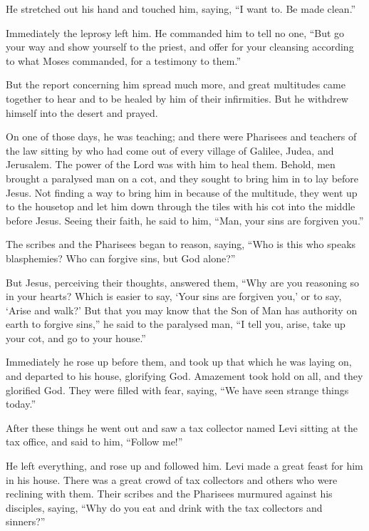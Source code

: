  He stretched out his hand and touched him, saying, ``I
want to. Be made clean.''

Immediately the leprosy left him.  He commanded him to
tell no one, ``But go your way and show yourself to the priest, and
offer for your cleansing according to what Moses commanded, for a
testimony to them.''

 But the report concerning him spread much more, and
great multitudes came together to hear and to be healed by him of their
infirmities.  But he withdrew himself into the desert and
prayed.

 On one of those days, he was teaching; and there were
Pharisees and teachers of the law sitting by who had come out of every
village of Galilee, Judea, and Jerusalem. The power of the Lord was with
him to heal them.  Behold, men brought a paralysed man on
a cot, and they sought to bring him in to lay before Jesus.
 Not finding a way to bring him in because of the
multitude, they went up to the housetop and let him down through the
tiles with his cot into the middle before Jesus.  Seeing
their faith, he said to him, ``Man, your sins are forgiven you.''

 The scribes and the Pharisees began to reason, saying,
``Who is this who speaks blasphemies? Who can forgive sins, but God
alone?''

 But Jesus, perceiving their thoughts, answered them,
``Why are you reasoning so in your hearts?  Which is
easier to say, `Your sins are forgiven you,' or to say, `Arise and
walk?'  But that you may know that the Son of Man has
authority on earth to forgive sins,'' he said to the paralysed man, ``I
tell you, arise, take up your cot, and go to your house.''

 Immediately he rose up before them, and took up that
which he was laying on, and departed to his house, glorifying God.
 Amazement took hold on all, and they glorified God. They
were filled with fear, saying, ``We have seen strange things today.''

 After these things he went out and saw a tax collector
named Levi sitting at the tax office, and said to him, ``Follow me!''

 He left everything, and rose up and followed him.
 Levi made a great feast for him in his house. There was
a great crowd of tax collectors and others who were reclining with them.
 Their scribes and the Pharisees murmured against his
disciples, saying, ``Why do you eat and drink with the tax collectors
and sinners?''

